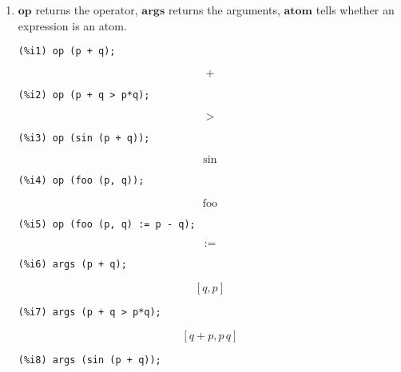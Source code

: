 \documentclass[12pt,leqno]{article}
\begin{document}
\begin{enumerate}
\item $\mathbf{op}$ returns the operator, $\mathbf{args}$ returns the arguments,
$\mathbf{atom}$ tells whether an expression is an atom.
\begin{verbatim}
(%i1) op (p + q);
\end{verbatim}
\begin{equation}
\mbox{ + }\tag{\%o1}
\label{eq:doc-group1-code10-1-1}
\end{equation}
\begin{verbatim}
(%i2) op (p + q > p*q);
\end{verbatim}
\begin{equation}
\mbox{ > }\tag{\%o2}
\label{eq:doc-group1-code10-2-1}
\end{equation}
\begin{verbatim}
(%i3) op (sin (p + q));
\end{verbatim}
\begin{equation}
\sin \tag{\%o3}
\label{eq:doc-group1-code10-3-1}
\end{equation}
\begin{verbatim}
(%i4) op (foo (p, q));
\end{verbatim}
\begin{equation}
\mathrm{foo}\tag{\%o4}
\label{eq:doc-group1-code10-4-1}
\end{equation}
\begin{verbatim}
(%i5) op (foo (p, q) := p - q);
\end{verbatim}
\begin{equation}
\mbox{ := }\tag{\%o5}
\label{eq:doc-group1-code10-5-1}
\end{equation}
\begin{verbatim}
(%i6) args (p + q);
\end{verbatim}
\begin{equation}
\left[ q , p \right] \tag{\%o6}
\label{eq:doc-group1-code10-6-1}
\end{equation}
\begin{verbatim}
(%i7) args (p + q > p*q);
\end{verbatim}
\begin{equation}
\left[ q+p , p\,q \right] \tag{\%o7}
\label{eq:doc-group1-code10-7-1}
\end{equation}
\begin{verbatim}
(%i8) args (sin (p + q));
\end{verbatim}

\end{enumerate}
\end{document}
